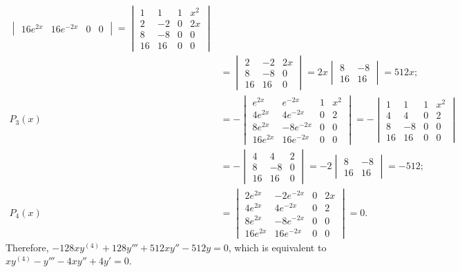 \documentclass[openany]{book}
\newenvironment{sectionSolutions}{
 \begin{enumerate}[item-label={\thesection.\arabic{enumi}.}]
}{
 \end{enumerate}
}
\begin{document}
\begin{sectionSolutions}
\begin{alist}
\begin{align*}
\begin{vmatrix}
16e^{2x}&16e^{-2x}&0&0
\end{vmatrix}=
\begin{vmatrix}
1&1&1&x^2\\
2&-2&0&2x\\
8&-8&0&0\\
16&16&0&0
\end{vmatrix}\\
&=\begin{vmatrix}
2&-2&2x\\
8&-8&0\\
16&16&0
\end{vmatrix}
=2x\begin{vmatrix}
8&-8\\
16&16
\end{vmatrix}=512x;\\
P_3(x)&=
-\begin{vmatrix}
e^{2x}&e^{-2x}&1&x^2\\
4e^{2x}&4e^{-2x}&0&2\\
8e^{2x}&-8e^{-2x}&0&0\\
16e^{2x}&16e^{-2x}&0&0
\end{vmatrix}=
-\begin{vmatrix}
1&1&1&x^2\\
4&4&0&2\\
8&-8&0&0\\
16&16&0&0
\end{vmatrix}\\
&=-\begin{vmatrix}
4&4&2\\
8&-8&0\\
16&16&0
\end{vmatrix}
=-2\begin{vmatrix}
8&-8\\
16&16
\end{vmatrix}=-512;\\
P_4(x)&=
\begin{vmatrix}
2e^{2x}&-2e^{-2x}&0&2x\\
4e^{2x}&4e^{-2x}&0&2\\
8e^{2x}&-8e^{-2x}&0&0\\
16e^{2x}&16e^{-2x}&0&0
\end{vmatrix}=0.
\end{align*}
Therefore,
$-128xy^{(4)}+128y'''+512xy''-512y=0$,
which is equivalent to
 $xy^{(4)}-y'''-4xy''+4y'=0$.
\end{alist}
\end{sectionSolutions}
\end{document}
